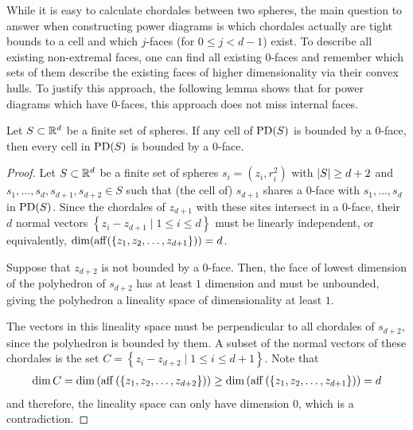 While it is easy to calculate chordales between two spheres, the main question to answer when constructing power diagrams is which chordales actually are tight bounds to a cell and which $j$-faces (for $0 \leq j < d - 1$) exist.
To describe all existing non-extremal faces, one can find all existing $0$-faces and remember which sets of them describe the existing faces of higher dimensionality via their convex hulls.
To justify this approach, the following lemma shows that for power diagrams which have $0$-faces, this approach does not miss internal faces.

\begin{lemma}
    Let $S \subset \mathbb{R}^d$ be a finite set of spheres.
    If any cell of $\operatorname{PD}(S)$ is bounded by a $0$-face, then every cell in $\operatorname{PD}(S)$ is bounded by a $0$-face.
\end{lemma}
\begin{proof}
    Let $S \subset \mathbb{R}^d$ be a finite set of spheres $s_i = (z_i, r_i^2)$ with $\left\vert S \right\vert \geq d+2$ and $s_1, \dots, s_d, s_{d+1}, s_{d+2} \in S$ such that (the cell of) $s_{d+1}$ shares a $0$-face with $s_1, \dots, s_d$ in $\operatorname{PD}(S)$.
    Since the chordales of $z_{d+1}$ with these sites intersect in a $0$-face, their $d$ normal vectors $\left\{  z_i - z_{d+1} \mid 1 \leq i \leq d\right\}$ must be linearly independent, or equivalently, $\dim(\operatorname{aff}(\left\{ z_1, z_2, \dots, z_{d+1} \right\})) = d$.

    Suppose that $z_{d+2}$ is not bounded by a $0$-face.
    Then, the face of lowest dimension of the polyhedron of $s_{d+2}$ has at least $1$ dimension and must be unbounded, giving the polyhedron a lineality space of dimensionality at least $1$.

    The vectors in this lineality space must be perpendicular to all chordales of $s_{d+2}$, since the polyhedron is bounded by them.
    A subset of the normal vectors of these chordales is the set $C = \left\{ z_i - z_{d+2} \mid 1 \leq i \leq d+1 \right\}$.
    Note that
    \begin{align}
        \dim C = \dim \left( \operatorname{aff} \left( \left\{ z_1, z_2, \dots, z_{d+2} \right\} \right) \right) \geq \dim \left( \operatorname{aff} \left( \left\{ z_1, z_2, \dots, z_{d+1} \right\} \right) \right) = d
    \end{align}
    and therefore, the lineality space can only have dimension $0$, which is a contradiction.
\end{proof}

